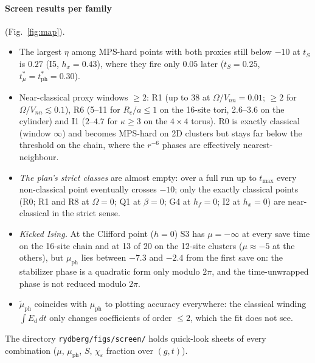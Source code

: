 \documentclass[11pt,a4paper]{article}
\newcommand{\tmu}{t^*_\mu}
\newcommand{\tph}{t^*_{\mathrm{ph}}}
\begin{document}
\paragraph{Screen results per family} (Fig.~\ref{fig:map}).
\begin{itemize}
  \item The largest $\eta$ among MPS-hard points with both proxies still below $-10$ at $t_S$ is $0.27$ (I5,
    $h_x=0.43$), where they fire only $0.05$ later ($t_S=0.25$, $\tmu=\tph=0.30$).
  \item Near-classical proxy windows $\ge2$: R1 (up to 38 at $\Omega/V_{nn}=0.01$; $\ge2$ for
    $\Omega/V_{nn}\lesssim0.1$), R6 (5--11 for $R_c/a\le1$ on the 16-site tori, 2.6--3.6 on the cylinder) and I1
    ($2$--$4.7$ for $\kappa\ge3$ on the $4\times4$ torus). R0 is exactly classical (window $\infty$) and becomes
    MPS-hard on 2D clusters but stays far below the threshold on the chain, where the $r^{-6}$
    phases are effectively nearest-neighbour.
  \item \emph{The plan's strict classes} are almost empty: over a full run up to $t_{\max}$ every non-classical point
    eventually crosses $-10$; only the exactly classical points (R0; R1 and R8 at $\Omega=0$; Q1 at $\beta=0$; G4 at
    $h_f=0$; I2 at $h_x=0$) are near-classical in the strict sense.
  \item \emph{Kicked Ising.} At the Clifford point ($h=0$) S3 has $\mu=-\infty$ at every save time on the 16-site
    chain and at 13 of 20 on the 12-site clusters ($\mu\approx-5$ at the others), but $\mu_{\mathrm{ph}}$ lies between
    $-7.3$ and $-2.4$ from the first save on: the stabilizer phase is a quadratic form only modulo $2\pi$, and the
    time-unwrapped phase is not reduced modulo $2\pi$.
  \item $\tilde\mu_{\mathrm{ph}}$ coincides with $\mu_{\mathrm{ph}}$ to plotting accuracy everywhere: the classical
    winding $\int E_d\,dt$ only changes coefficients of order $\le2$, which the fit does not see.
\end{itemize}
The directory \texttt{rydberg/figs/screen/} holds quick-look sheets of every combination ($\mu$,
$\mu_{\mathrm{ph}}$, $S$, $\chi_\varepsilon$ fraction over $(g,t)$).
\end{document}
